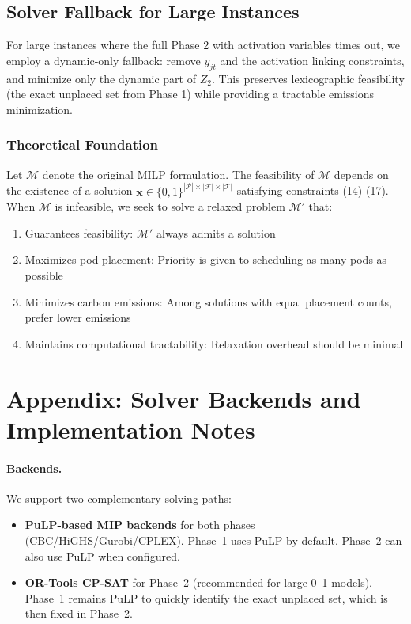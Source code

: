 \documentclass{article}
\begin{document}
\subsection{Solver Fallback for Large Instances}

For large instances where the full Phase 2 with activation variables times out, we employ a dynamic‑only fallback: remove $y_{jt}$ and the activation linking constraints, and minimize only the dynamic part of $Z_2$. This preserves lexicographic feasibility (the exact unplaced set from Phase 1) while providing a tractable emissions minimization.

\subsubsection{Theoretical Foundation}

Let $\mathcal{M}$ denote the original MILP formulation. The feasibility of $\mathcal{M}$ depends on the existence of a solution $\mathbf{x} \in \{0,1\}^{|\mathcal{P}| \times |\mathcal{F}| \times |\mathcal{T}|}$ satisfying constraints (14)-(17). When $\mathcal{M}$ is infeasible, we seek to solve a relaxed problem $\mathcal{M}'$ that:

\begin{enumerate}
\item Guarantees feasibility: $\mathcal{M}'$ always admits a solution
\item Maximizes pod placement: Priority is given to scheduling as many pods as possible
\item Minimizes carbon emissions: Among solutions with equal placement counts, prefer lower emissions
\item Maintains computational tractability: Relaxation overhead should be minimal
\end{enumerate}

\section*{Appendix: Solver Backends and Implementation Notes}

\paragraph{Backends.} We support two complementary solving paths:
\begin{itemize}
  \item \textbf{PuLP-based MIP backends} for both phases (CBC/HiGHS/Gurobi/CPLEX). Phase~1 uses PuLP by default. Phase~2 can also use PuLP when configured.
  \item \textbf{OR-Tools CP-SAT} for Phase~2 (recommended for large 0--1 models). Phase~1 remains PuLP to quickly identify the exact unplaced set, which is then fixed in Phase~2.
\end{itemize}
\end{document}
